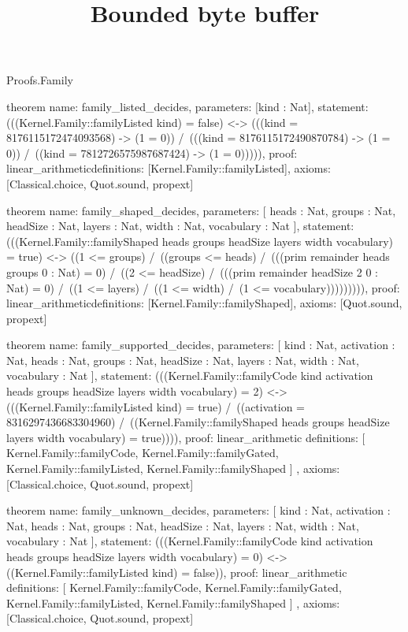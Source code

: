 \begin{lexlean}{Proofs.Family}
\title{Bounded byte buffer}
\begin{semanticmodule}
theorem{
  name: family_listed_decides,
  parameters: [kind : Nat],
  statement: (((Kernel.Family::familyListed kind) = false) <-> (((kind = 8176115172474093568) -> (1 = 0)) /\ (((kind = 8176115172490870784) -> (1 = 0)) /\ ((kind = 7812726575987687424) -> (1 = 0))))),
  proof: linear_arithmetic{definitions: [Kernel.Family::familyListed]},
  axioms: [Classical.choice, Quot.sound, propext]
}

theorem{
  name: family_shaped_decides,
  parameters: [
    heads : Nat,
    groups : Nat,
    headSize : Nat,
    layers : Nat,
    width : Nat,
    vocabulary : Nat
  ],
  statement: (((Kernel.Family::familyShaped heads groups headSize layers width vocabulary) = true) <-> ((1 <= groups) /\ ((groups <= heads) /\ (((prim remainder heads groups 0 : Nat) = 0) /\ ((2 <= headSize) /\ (((prim remainder headSize 2 0 : Nat) = 0) /\ ((1 <= layers) /\ ((1 <= width) /\ (1 <= vocabulary))))))))),
  proof: linear_arithmetic{definitions: [Kernel.Family::familyShaped]},
  axioms: [Quot.sound, propext]
}

theorem{
  name: family_supported_decides,
  parameters: [
    kind : Nat,
    activation : Nat,
    heads : Nat,
    groups : Nat,
    headSize : Nat,
    layers : Nat,
    width : Nat,
    vocabulary : Nat
  ],
  statement: (((Kernel.Family::familyCode kind activation heads groups headSize layers width vocabulary) = 2) <-> (((Kernel.Family::familyListed kind) = true) /\ ((activation = 8316297436683304960) /\ ((Kernel.Family::familyShaped heads groups headSize layers width vocabulary) = true)))),
  proof: linear_arithmetic{
    definitions: [
      Kernel.Family::familyCode,
      Kernel.Family::familyGated,
      Kernel.Family::familyListed,
      Kernel.Family::familyShaped
    ]
  },
  axioms: [Classical.choice, Quot.sound, propext]
}

theorem{
  name: family_unknown_decides,
  parameters: [
    kind : Nat,
    activation : Nat,
    heads : Nat,
    groups : Nat,
    headSize : Nat,
    layers : Nat,
    width : Nat,
    vocabulary : Nat
  ],
  statement: (((Kernel.Family::familyCode kind activation heads groups headSize layers width vocabulary) = 0) <-> ((Kernel.Family::familyListed kind) = false)),
  proof: linear_arithmetic{
    definitions: [
      Kernel.Family::familyCode,
      Kernel.Family::familyGated,
      Kernel.Family::familyListed,
      Kernel.Family::familyShaped
    ]
  },
  axioms: [Classical.choice, Quot.sound, propext]
}
\end{semanticmodule}
\end{lexlean}
